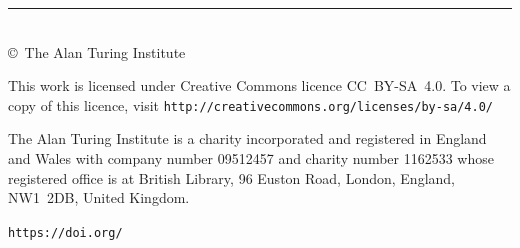 \documentclass[a4paper]{article}
\begin{document}
\begin{titlepage}
\raggedright\setlength{\parindent}{0pt}%
\vspace*{5\turingcolht}

\begin{minipage}{9\turingcolwd}
\small\raggedright%
{\offinterlineskip\rule{9\turingcolwd}{0.15ex}\\[0.5ex]
\copyright\ The Alan Turing Institute \reportCopyrightDate\par}
\medskip 

This work is licensed under Creative Commons licence
CC~BY-SA~4.0. To view a copy of this licence, visit
\fontsize{7.5}{11}\selectfont
\texttt{http://creativecommons.org/licenses/by-sa/4.0/}
\medskip

The Alan Turing Institute is a charity incorporated and registered in
England and Wales with company number 09512457 and charity number
1162533 whose registered office is at British Library, 96 Euston Road,
London, England, NW1~2DB, United Kingdom.
\medskip

\texttt{https://doi.org/\reportDOI}
\end{minipage}
\end{titlepage}
\end{document}
